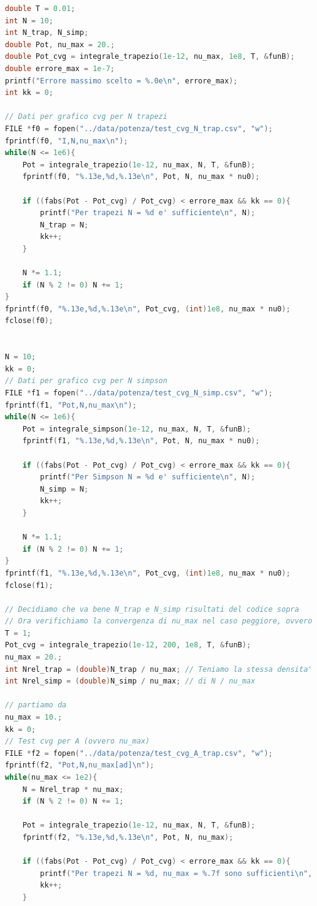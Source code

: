 \documentclass[a4paper, titlepage]{article}
\begin{document}
\begin{lstlisting}[language=C]
double T = 0.01;
int N = 10;
int N_trap, N_simp;
double Pot, nu_max = 20.;
double Pot_cvg = integrale_trapezio(1e-12, nu_max, 1e8, T, &funB);
double errore_max = 1e-7;
printf("Errore massimo scelto = %.0e\n", errore_max);
int kk = 0;

// Dati per grafico cvg per N trapezi
FILE *f0 = fopen("../data/potenza/test_cvg_N_trap.csv", "w");
fprintf(f0, "I,N,nu_max\n");
while(N <= 1e6){
    Pot = integrale_trapezio(1e-12, nu_max, N, T, &funB);
    fprintf(f0, "%.13e,%d,%.13e\n", Pot, N, nu_max * nu0);

    if ((fabs(Pot - Pot_cvg) / Pot_cvg) < errore_max && kk == 0){
        printf("Per trapezi N = %d e' sufficiente\n", N);
        N_trap = N;
        kk++;
    }

    N *= 1.1;
    if (N % 2 != 0) N += 1;
}
fprintf(f0, "%.13e,%d,%.13e\n", Pot_cvg, (int)1e8, nu_max * nu0);
fclose(f0);


N = 10;
kk = 0;
// Dati per grafico cvg per N simpson
FILE *f1 = fopen("../data/potenza/test_cvg_N_simp.csv", "w");
fprintf(f1, "Pot,N,nu_max\n");
while(N <= 1e6){
    Pot = integrale_simpson(1e-12, nu_max, N, T, &funB);
    fprintf(f1, "%.13e,%d,%.13e\n", Pot, N, nu_max * nu0);

    if ((fabs(Pot - Pot_cvg) / Pot_cvg) < errore_max && kk == 0){
        printf("Per Simpson N = %d e' sufficiente\n", N);
        N_simp = N;
        kk++;
    }

    N *= 1.1;
    if (N % 2 != 0) N += 1;
}
fprintf(f1, "%.13e,%d,%.13e\n", Pot_cvg, (int)1e8, nu_max * nu0);
fclose(f1);

// Decidiamo che va bene N_trap e N_simp risultati del codice sopra
// Ora verifichiamo la convergenza di nu_max nel caso peggiore, ovvero
T = 1;
Pot_cvg = integrale_trapezio(1e-12, 200, 1e8, T, &funB);
nu_max = 20.;
int Nrel_trap = (double)N_trap / nu_max; // Teniamo la stessa densita'
int Nrel_simp = (double)N_simp / nu_max; // di N / nu_max

// partiamo da
nu_max = 10.;
kk = 0;
// Test cvg per A (ovvero nu_max)
FILE *f2 = fopen("../data/potenza/test_cvg_A_trap.csv", "w");
fprintf(f2, "Pot,N,nu_max[ad]\n");
while(nu_max <= 1e2){
    N = Nrel_trap * nu_max;
    if (N % 2 != 0) N += 1;

    Pot = integrale_trapezio(1e-12, nu_max, N, T, &funB);
    fprintf(f2, "%.13e,%d,%.13e\n", Pot, N, nu_max);

    if ((fabs(Pot - Pot_cvg) / Pot_cvg) < errore_max && kk == 0){
        printf("Per trapezi N = %d, nu_max = %.7f sono sufficienti\n", N, nu_max);
        kk++;
    }


\end{lstlisting}
\end{document}

